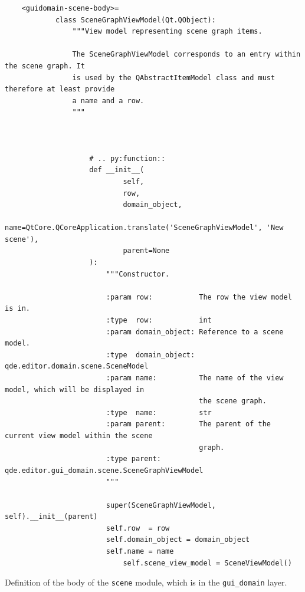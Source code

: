 \documentclass[10pt, openright, notitlepage]{scrreprt}
\begin{document}
\begin{listing}[H]
\begin{verbatim}
    <guidomain-scene-body>=
            class SceneGraphViewModel(Qt.QObject):
                """View model representing scene graph items.
            
                The SceneGraphViewModel corresponds to an entry within the scene graph. It
                is used by the QAbstractItemModel class and must therefore at least provide
                a name and a row.
                """
            
                
            
                    # .. py:function::
                    def __init__(
                            self,
                            row,
                            domain_object,
                            name=QtCore.QCoreApplication.translate('SceneGraphViewModel', 'New scene'),
                            parent=None
                    ):
                        """Constructor.
                    
                        :param row:           The row the view model is in.
                        :type  row:           int
                        :param domain_object: Reference to a scene model.
                        :type  domain_object: qde.editor.domain.scene.SceneModel
                        :param name:          The name of the view model, which will be displayed in
                                              the scene graph.
                        :type  name:          str
                        :param parent:        The parent of the current view model within the scene
                                              graph.
                        :type parent:         qde.editor.gui_domain.scene.SceneGraphViewModel
                        """
                    
                        super(SceneGraphViewModel, self).__init__(parent)
                        self.row  = row
                        self.domain_object = domain_object
                        self.name = name
                            self.scene_view_model = SceneViewModel()
\end{verbatim}
\caption{\label{lst:guidomain-scene-scenegraphviewmodel}
Definition of the body of the \texttt{scene} module, which is in the \texttt{gui\_domain} layer.}
\end{listing}
\end{document}

